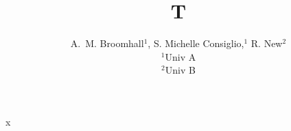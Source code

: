 \documentclass{article}
\begin{document}
\title{T}
\author{A.~M. Broomhall$^1$, S. Michelle Consiglio,$^{1}$ R. New$^2$\\
$^1$Univ A\\$^2$Univ B}
\maketitle
x
\end{document}
